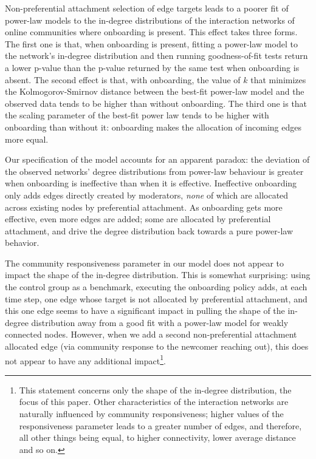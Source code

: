 \documentclass{nws}
\begin{document}
Non-preferential attachment selection of edge targets leads to a poorer fit of power-law models to the in-degree distributions of the interaction networks of online communities where onboarding is present. This effect takes three forms. The first one is that, when onboarding is present, fitting a power-law model to the network's in-degree distribution and then running goodness-of-fit tests return a lower p-value than the p-value returned by the same test when onboarding is absent. The second effect is that, with onboarding, the value of $k$ that minimizes the Kolmogorov-Smirnov distance between the best-fit power-law model and the observed data tends to be higher than without onboarding. The third one is that the scaling parameter of the best-fit power law tends to be higher with onboarding than without it: onboarding makes the allocation of incoming edges more equal. 

Our specification of the model accounts for an apparent paradox: the deviation of the observed networks' degree distributions from power-law behaviour is greater when onboarding is ineffective than when it is effective. Ineffective onboarding only adds edges directly created by moderators, \emph{none} of which are allocated across existing nodes by preferential attachment. As onboarding gets more effective, even more edges are added; some are allocated by preferential attachment, and drive the degree distribution back towards a pure power-law behavior. 

The community responsiveness parameter in our model does not appear to impact the shape of the in-degree distribution. This is somewhat surprising: using the control group as a benchmark, executing the onboarding policy adds, at each time step, one edge whose target is not allocated by preferential attachment, and this one edge seems to have a significant impact in pulling the shape of the in-degree distribution away from a good fit with a power-law model for weakly connected nodes. However, when we add a second non-preferential attachment allocated edge (via community response to the newcomer reaching out), this does not appear to have any additional impact\footnote{This statement concerns only the shape of the in-degree distribution, the focus of this paper. Other characteristics of the interaction networks are naturally influenced by community responsiveness; higher values of the responsiveness parameter leads to a greater number of edges, and therefore, all other things being equal, to higher connectivity, lower average distance and so on. }.
\end{document}
